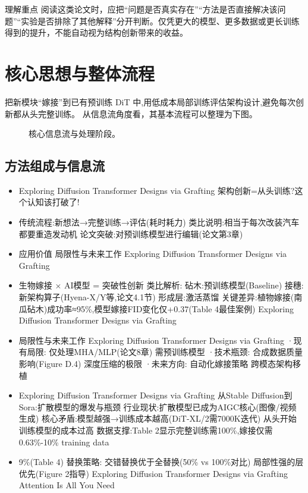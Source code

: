 \documentclass[UTF8,11pt,a4paper]{ctexart}
\begin{document}
\begin{notebox}{理解重点}
阅读这类论文时，应把“问题是否真实存在”“方法是否直接解决该问题”“实验是否排除了其他解释”分开判断。仅凭更大的模型、更多数据或更长训练得到的提升，不能自动视为结构创新带来的收益。
\end{notebox}

\section{核心思想与整体流程}
把新模块“嫁接”到已有预训练 DiT 中,用低成本局部训练评估架构设计,避免每次创新都从头完整训练。 从信息流角度看，其基本流程可以整理为下图。

\begin{figure}[H]
\centering
{}
\caption{核心信息流与处理阶段。}
\end{figure}

\subsection{方法组成与信息流}
\begin{itemize}
\item Exploring Diffusion Transformer Designs via Grafting 架构创新=从头训练?这个认知该打破了!
\item 传统流程:新想法→完整训练→评估(耗时耗力) 类比说明:相当于每次改装汽车都要重造发动机 论文突破:对预训练模型进行编辑(论文第3章)
\item 应用价值 局限性与未来工作 Exploring Diffusion Transformer Designs via Grafting
\item 生物嫁接 × AI模型 = 突破性创新 类比解析: 砧木:预训练模型(Baseline) 接穗:新架构算子(Hyena-X/Y等,论文4.1节) 形成层:激活蒸馏 关键差异:植物嫁接(南瓜砧木)成功率≈95\%,模型嫁接FID变化仅+0.37(Table 4最佳案例) Exploring Diffusion Transformer Designs via Grafting
\item 局限性与未来工作 Exploring Diffusion Transformer Designs via Grafting ·现有局限: 仅处理MHA/MLP(论文8章) 需预训练模型 ·技术瓶颈: 合成数据质量影响(Figure D.4) 深度压缩的极限 ·未来方向: 自动化嫁接策略 跨模态架构移植
\item Exploring Diffusion Transformer Designs via Grafting 从Stable Diffusion到Sora:扩散模型的爆发与瓶颈 行业现状:扩散模型已成为AIGC核心(图像/视频生成) 核心矛盾:模型越强→训练成本越高(DiT-XL/2需7000K迭代) 从头开始训练模型的成本过高 数据支撑:Table 2显示完整训练需100\%,嫁接仅需0.63\%-10\% training data
\item 9\%(Table 4) 替换策略: 交错替换优于全替换(50\% vs 100\%对比) 局部性强的层优先(Figure 2指导) Exploring Diffusion Transformer Designs via Grafting Attention Is All You Need
\end{itemize}
\end{document}
